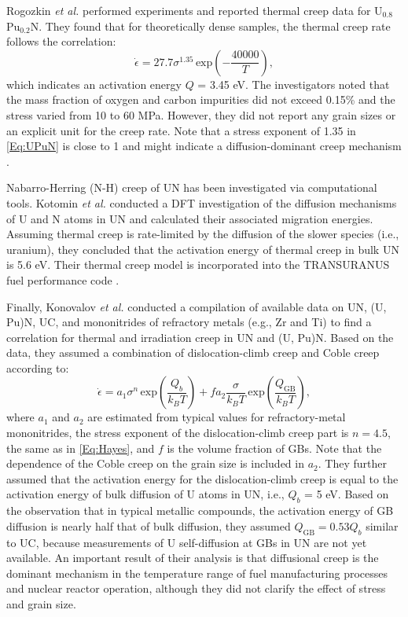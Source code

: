 \documentclass[preprint, 12pt]{elsarticle}
\newcommand{\?}{\stackrel{?}{=}}
\begin{document}
Rogozkin \textit{et al.} \cite{Rogozkin2003} performed experiments and reported thermal creep data for U$_{0.8}$Pu$_{0.2}$N. They found that for theoretically dense samples, the thermal creep rate follows the correlation:
\begin{equation}
\Dot{\epsilon} = 27.7 \sigma^{1.35} \, \mathrm{exp} \! \left( - \frac{40000}{T} \right),
\label{Eq:UPuN}
\end{equation}
which indicates an activation energy $Q$ = 3.45 eV. The investigators noted that the mass fraction of oxygen and carbon impurities did not exceed 0.15\% and the stress varied from 10 to 60 MPa. However, they did not report any grain sizes or an explicit unit for the creep rate. Note that a stress exponent of 1.35 in \cref{Eq:UPuN} is close to 1 and might indicate a diffusion-dominant creep mechanism \cite{Rogozkin2003, Meyers2009}.

Nabarro-Herring (N-H) creep of UN has been investigated via computational tools. Kotomin \textit{et al.} \cite{Kotomin2009} conducted a DFT investigation of the diffusion mechanisms of U and N atoms in UN and calculated their associated migration energies. Assuming thermal creep is rate-limited by the diffusion of the slower species (i.e., uranium), they concluded that the activation energy of thermal creep in bulk UN is 5.6 eV. Their thermal creep model is incorporated into the TRANSURANUS fuel performance code \cite{Kotomin2009}.

Finally, Konovalov \textit{et al.} \cite{Konovalov2016} conducted a compilation of available data on UN, (U, Pu)N, UC, and mononitrides of refractory metals (e.g., Zr and Ti) to find a correlation for thermal and irradiation creep in UN and (U, Pu)N. Based on the data, they assumed a combination of dislocation-climb creep and Coble creep according to:
\begin{equation}
\Dot{\epsilon} = a_1 \sigma^n \, \mathrm{exp} \! \left( \frac{Q_b}{k_B T} \right) + f a_2 \frac{\sigma}{k_B T} \, \mathrm{exp} \! \left( \frac{Q_\mathrm{GB}}{k_B T} \right),
\end{equation}
where $a_1$ and $a_2$ are estimated from typical values for refractory-metal mononitrides, the stress exponent of the dislocation-climb creep part is $n=4.5$, the same as in \cref{Eq:Hayes}, and $f$ is the volume fraction of GBs. Note that the dependence of the Coble creep on the grain size is included in $a_2$. They further assumed that the activation energy for the dislocation-climb creep is equal to the activation energy of bulk diffusion of U atoms in UN, i.e., $Q_b$ = 5 eV. Based on the observation that in typical metallic compounds, the activation energy of GB diffusion is nearly half that of bulk diffusion, they assumed $Q_\mathrm{GB} = 0.53 Q_b$ similar to UC, because measurements of U self-diffusion at GBs in UN are not yet available. An important result of their analysis is that diffusional creep is the dominant mechanism in the temperature range of fuel manufacturing processes and nuclear reactor operation, although they did not clarify the effect of stress and grain size.
\end{document}
